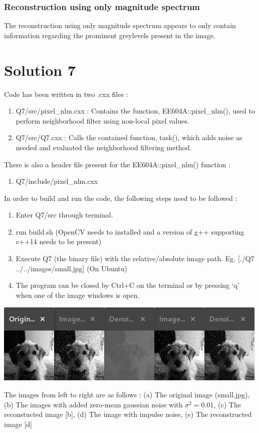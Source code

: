 \documentclass[a4paper,fleqn,11pt]{article}
\theoremstyle{mytheor}
\begin{document}
\subsubsection*{Reconstruction using only magnitude spectrum}
The reconstruction using only magnitude spectrum appears to only contain information regarding the prominent greylevels present in the image.

\section*{Solution 7}
Code has been written in two .cxx files :
\begin{enumerate}
\item Q7/src/pixel\_nlm.cxx : Contains the function, EE604A::pixel\_nlm(), used to perform neighborhood filter using non-local pixel values.
\item Q7/src/Q7.cxx : Calls the contained function, task(), which adds noise as needed and evaluated the neighborhood filtering method.
\end{enumerate}

There is also a header file present for the EE604A::pixel\_nlm() function :
\begin{enumerate}
\item Q7/include/pixel\_nlm.cxx
\end{enumerate}

In order to build and run the code, the following steps need to be followed :
\begin{enumerate}
\item Enter Q7/src through terminal.
\item run build.sh (OpenCV needs to installed and a version of g++ supporting c++14 needs to be present)
\item Execute Q7 (the binary file) with the relative/absolute image path. Eg. [./Q7 ../../images/small.jpg] (On Ubuntu)
\item The program can be closed by Ctrl+C on the terminal or by pressing `q' when one of the image windows is open.
\end{enumerate}
\begin{center}
\includegraphics[scale=1.0]{../results/Q7.png}
\end{center}
The images from left to right are as follows : (a) The original image (small.jpg), (b) The images with added zero-mean gaussian noise with $\sigma^2 = 0.01$, (c) The reconstucted image [b], (d) The image with impulse noise, (e) The reconstructed image [d]
\end{document}
